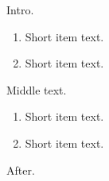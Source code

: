 \documentclass[10pt]{article}
\begin{document}
Intro.
\begin{enumerate}[start=3]
\item Short item text.
\item Short item text.
\end{enumerate}
Middle text.
\begin{enumerate}[resume]
\item Short item text.
\item Short item text.
\end{enumerate}
After.
\end{document}
